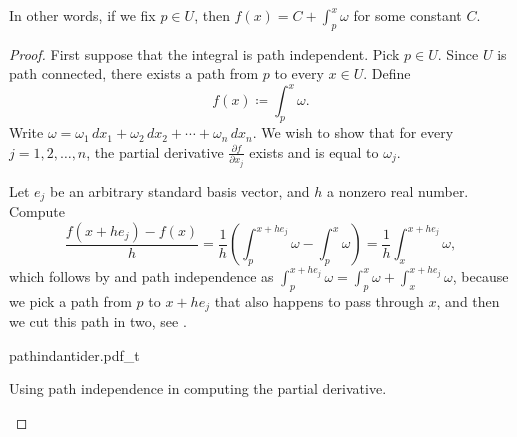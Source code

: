 In other words, if we fix $p \in U$, then $f(x) = C + \int_{p}^x \omega$
for some constant $C$.

\begin{proof}
First suppose that the integral is path independent.  Pick $p \in U$.  Since
$U$ is path connected, there exists a path from $p$ to every $x \in U$.
Define
\begin{equation*}
f(x) \coloneqq \int_{p}^x \omega .
\end{equation*}
Write $\omega = \omega_1 \,dx_1 + \omega_2 \,dx_2 + \cdots + \omega_n \,dx_n$.
We wish to show that for every $j = 1,2,\ldots,n$, the
partial derivative $\frac{\partial f}{\partial x_j}$ exists
and is equal to $\omega_j$.

Let $e_j$ be an arbitrary standard basis vector, and $h$ a nonzero real
number.  Compute
\begin{equation*}
\frac{f(x+h e_j) - f(x)}{h} =
\frac{1}{h} \left( \int_{p}^{x+he_j} \omega - \int_{p}^x \omega \right)
=
\frac{1}{h} \int_{x}^{x+he_j} \omega ,
\end{equation*}
which follows by  and path independence as 
$\int_{p}^{x+he_j} \omega =
\int_{p}^{x} \omega +
\int_{x}^{x+he_j} \omega$, because we pick a path from $p$ to
$x+he_j$ that also happens to pass through $x$, and then we cut this path in
two, see .

\begin{myfigureht}
{pathindantider.pdf_t}
\caption{Using path independence in computing the partial
derivative.\label{fig:pathindantider}}
\end{myfigureht}



\end{proof}
